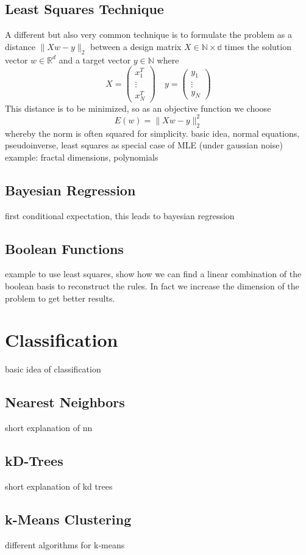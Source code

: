\documentclass{article}
\begin{document}
\subsection{Least Squares Technique}
A different but also very common technique is to formulate the problem as a distance $\lVert Xw-y\lVert_2$ between a design matrix $X\in\mathbb{N\times d}$ times the solution vector $w\in\mathbb{R}^d$ and a target vector $y\in\mathbb{N}$ where
\[X = \begin{pmatrix}
x_1^T \\ \vdots \\ x_N^T
\end{pmatrix}\quad y = \begin{pmatrix}
y_1 \\ \vdots \\ y_N
\end{pmatrix}\]
This distance is to be minimized, so as an objective function we choose
\[E(w) = \lVert Xw-y \lVert_2^2\]
whereby the norm is often squared for simplicity.
basic idea, normal equations, pseudoinverse, least squares as special case of MLE (under gaussian noise)
example: fractal dimensions, polynomials
\subsection{Bayesian Regression}
first conditional expectation, this leads to bayesian regression
\subsection{Boolean Functions}
example to use least squares, show how we can find a linear combination of the boolean basis to reconstruct the rules. In fact we increase the dimension of the problem to get better results.
\section{Classification}
basic idea of classification
\subsection{Nearest Neighbors}
short explanation of nn
\subsection{kD-Trees}
short explanation of kd trees
\subsection{k-Means Clustering}
different algorithms for k-means
\end{document}
